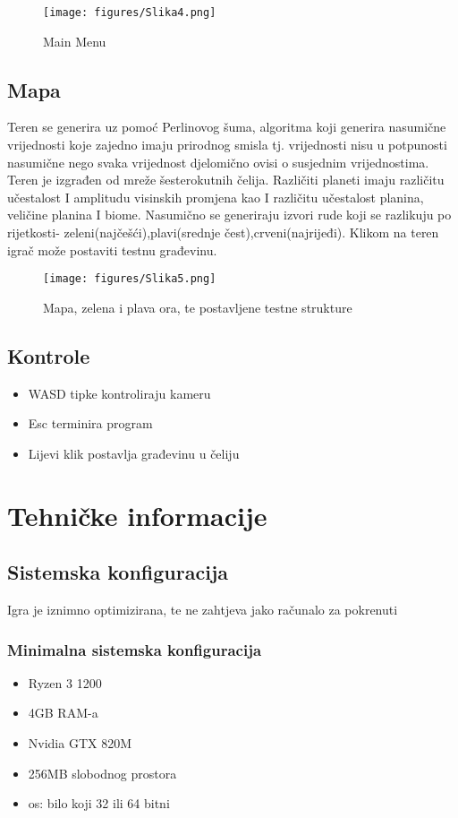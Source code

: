 \documentclass[12pt]{article}
\begin{document}
	\begin{wrapfigure}{R}{1\textwidth}
		\texttt{[image: figures/Slika4.png]}
		\caption{Main Menu}
		\label{fig:fig_4}
	\end{wrapfigure}

	
	
	\clearpage
	\subsection{Mapa}
	Teren se generira uz pomoć Perlinovog šuma, algoritma koji generira nasumične vrijednosti koje zajedno imaju prirodnog smisla tj. vrijednosti nisu u potpunosti nasumične nego svaka vrijednost djelomično ovisi o susjednim vrijednostima. Teren je izgrađen od mreže šesterokutnih čelija. Različiti planeti imaju različitu učestalost I amplitudu visinskih promjena kao I različitu učestalost planina, veličine planina I  biome. Nasumično se generiraju izvori rude koji se razlikuju po rijetkosti- zeleni(najčešći),plavi(srednje čest),crveni(najrijeđi). Klikom na teren igrač može postaviti testnu građevinu. 
	
	\begin{wrapfigure}{R}{1\textwidth}
		\texttt{[image: figures/Slika5.png]}
		\caption{Mapa, zelena i plava ora, te postavljene testne strukture}
		\label{fig:fig_5}
	\end{wrapfigure}

	\clearpage
	\subsection{Kontrole}
	\begin{itemize}
		\item	WASD tipke kontroliraju kameru
		\item	Esc terminira program
		\item	Lijevi klik postavlja građevinu u čeliju
	\end{itemize}
	
	\clearpage
	\section{Tehničke informacije}
	\subsection{Sistemska konfiguracija}
	Igra je iznimno optimizirana, te ne zahtjeva jako računalo za pokrenuti
	
	\subsubsection{Minimalna sistemska konfiguracija}
	\begin{itemize}
		\item	Ryzen 3 1200
		\item	4GB RAM-a
		\item	Nvidia GTX 820M
		\item	256MB slobodnog prostora
		\item 	os: bilo koji 32 ili 64 bitni
	\end{itemize}
	
\end{document}
